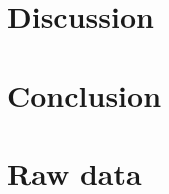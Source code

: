 \documentclass[]{report}
\begin{document}
\chapter{Discussion}


\chapter{Conclusion}


\appendix
\chapter{Raw data}

%
%
%
%
%


\end{document}
